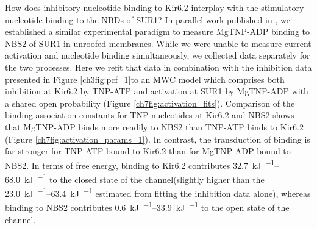 How does inhibitory nucleotide binding to Kir6.2 interplay with the stimulatory nucleotide binding to the NBDs of SUR1?
In parallel work published in \citeauthor{puljung_activation_2019}, we established a similar experimental paradigm to measure MgTNP-ADP binding to NBS2 of SUR1 in unroofed membranes.
While we were unable to measure current activation and nucleotide binding simultaneously, we collected data separately for the two processes.
Here we refit that data in combination with the inhibition data presented in Figure \ref{ch3fig:pcf_1}to an MWC model which comprises both inhibition at Kir6.2 by TNP-ATP and activation at SUR1 by MgTNP-ADP with a shared open probability (Figure \ref{ch7fig:activation_fits}).
Comparison of the binding association constants for TNP-nucleotides at Kir6.2 and NBS2 shows that MgTNP-ADP binds more readily to NBS2 than TNP-ATP binds to Kir6.2 (Figure \ref{ch7fig:activation_params_1}).
In contrast, the transduction of binding is far stronger for TNP-ATP bound to Kir6.2 than for MgTNP-ADP bound to NBS2.
In terms of free energy, binding to Kir6.2 contributes \SIrange{32.7}{68.0}{\kilo\joule\per\Molar} to the closed state of the channel(slightly higher than the \SIrange{23.0}{63.4}{\kilo\joule\per\Molar} estimated from fitting the inhibition data alone), whereas binding to NBS2 contributes \SIrange{0.6}{33.9}{\kilo\joule\per\Molar} to the open state of the channel.


